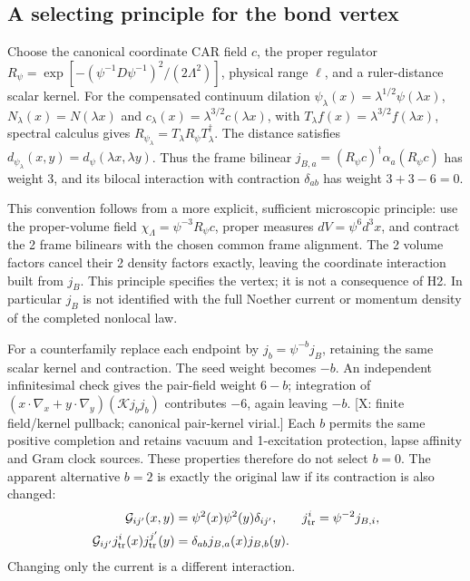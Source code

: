 \subsection*{A selecting principle for the bond vertex}
Choose the canonical coordinate CAR field $c$, the proper regulator
$R_\psi=\exp[-(\psi^{-1}D\psi^{-1})^2/(2\Lambda^2)]$,
physical range $\ell$, and a ruler-distance scalar kernel.
For the compensated continuum dilation
$\psi_\lambda(x)=\lambda^{1/2}\psi(\lambda x)$,
$N_\lambda(x)=N(\lambda x)$ and
$c_\lambda(x)=\lambda^{3/2}c(\lambda x)$, with
$T_\lambda f(x)=\lambda^{3/2}f(\lambda x)$,
spectral calculus gives $R_{\psi_\lambda}=T_\lambda R_\psi T_\lambda^\dagger$.
The distance satisfies
$d_{\psi_\lambda}(x,y)=d_\psi(\lambda x,\lambda y)$.
Thus the frame bilinear
$j_{B,a}=(R_\psi c)^\dagger\alpha_a(R_\psi c)$ has weight 3,
and its bilocal interaction with contraction $\delta_{ab}$ has
weight $3+3-6=0$.

This convention follows from a more explicit, sufficient microscopic
principle: use the proper-volume field
$\chi_\Lambda=\psi^{-3}R_\psi c$, proper measures
$dV=\psi^6d^3x$, and contract the 2 frame bilinears with the
chosen common frame alignment.
The 2 volume factors cancel their 2 density factors exactly,
leaving the coordinate interaction built from $j_B$.
This principle specifies the vertex; it is not a consequence of H2.
In particular $j_B$ is not identified with the full Noether current
or momentum density of the completed nonlocal law.

For a counterfamily replace each endpoint by
$j_b=\psi^{-b}j_B$, retaining the same scalar kernel and contraction.
The seed weight becomes $-b$.
An independent infinitesimal check gives the pair-field weight
$6-b$; integration of
$(x\cdot\nabla_x+y\cdot\nabla_y)(\mathcal K j_bj_b)$
contributes $-6$, again leaving $-b$.
[X: finite field/kernel pullback; canonical pair-kernel virial.]
Each $b$ permits the same positive completion and retains vacuum
and 1-excitation protection, lapse affinity and Gram clock sources.
These properties therefore do not select $b=0$.
The apparent alternative $b=2$ is exactly the original law if its
contraction is also changed:
\[
 \begin{aligned}
 \mathcal G_{ij'}(x,y)&=\psi^2(x)\psi^2(y)\delta_{ij'},
 &j_{\rm tr}^i&=\psi^{-2}j_{B,i},\\
 \mathcal G_{ij'}j_{\rm tr}^i(x)j_{\rm tr}^{j'}(y)
   &=\delta_{ab}j_{B,a}(x)j_{B,b}(y).
 \end{aligned}
\]
Changing only the current is a different interaction.

